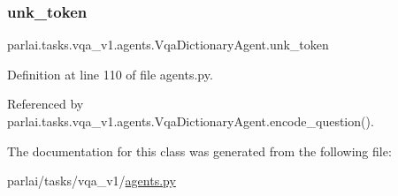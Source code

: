 \mbox{\label{classparlai_1_1tasks_1_1vqa__v1_1_1agents_1_1VqaDictionaryAgent_a96b51ba936dc32fbd8d8d297fb159b48}} 
\subsubsection{\texorpdfstring{unk\+\_\+token}{unk\_token}}
{\footnotesize\ttfamily parlai.\+tasks.\+vqa\+\_\+v1.\+agents.\+Vqa\+Dictionary\+Agent.\+unk\+\_\+token}



Definition at line 110 of file agents.\+py.



Referenced by parlai.\+tasks.\+vqa\+\_\+v1.\+agents.\+Vqa\+Dictionary\+Agent.\+encode\+\_\+question().



The documentation for this class was generated from the following file\+:\begin{DoxyCompactItemize}
\item 
parlai/tasks/vqa\+\_\+v1/\hyperlink{parlai_2tasks_2vqa__v1_2agents_8py}{agents.\+py}\end{DoxyCompactItemize}
